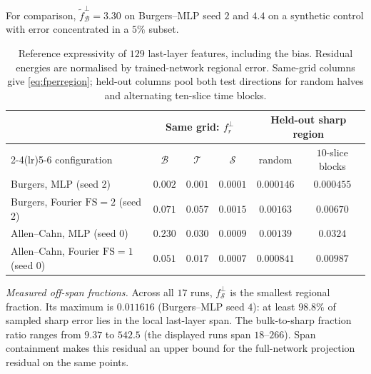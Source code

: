 For comparison, $\tilde f_{\mathcal B}^\perp=3.30$ on Burgers--MLP seed $2$ and $4.4$
on a synthetic control with error concentrated in a $5\%$ subset.

\begin{table}[t]
\centering

\small
\begin{tabular}{@{}lccccc@{}}
\toprule
& \multicolumn{3}{c}{Same grid: $f^{\perp}_r$} & \multicolumn{2}{c}{Held-out sharp region} \\
\cmidrule(lr){2-4}\cmidrule(lr){5-6}
configuration & $\mathcal{B}$ & $\mathcal{T}$ & $\mathcal{S}$ & random & $10$-slice blocks \\
\midrule
Burgers, MLP (seed 2)                        & $0.002$ & $0.001$ & $\mathbf{0.0001}$ & $0.000146$ & $0.000455$ \\
Burgers, Fourier $\mathrm{FS}=2$ (seed 2)    & $0.071$ & $0.057$ & $\mathbf{0.0015}$ & $0.00163$ & $0.00670$ \\
Allen--Cahn, MLP (seed 0)                    & $0.230$ & $0.030$ & $\mathbf{0.0009}$ & $0.00139$ & $0.0324$ \\
Allen--Cahn, Fourier $\mathrm{FS}=1$ (seed 0)& $0.051$ & $0.017$ & $\mathbf{0.0007}$ & $0.000841$ & $0.00987$ \\
\bottomrule
\end{tabular}
\caption{Reference expressivity of $129$ last-layer features, including the bias.
Residual energies are normalised by trained-network regional error. Same-grid columns
give \eqref{eq:fperregion}; held-out columns pool both test directions for random halves
and alternating ten-slice time blocks.}
\label{tab:offmanifold}
\end{table}

\emph{Measured off-span fractions.} Across all $17$ runs,
$f_{\mathcal S}^\perp$ is the smallest regional fraction. Its maximum
is $0.011616$ (Burgers--MLP seed $4$): at least $98.8\%$ of sampled sharp error lies
in the local last-layer span. The bulk-to-sharp fraction ratio ranges from $9.37$ to
$542.5$ (the displayed runs span $18$--$266$). Span containment makes this residual
an upper bound for the full-network projection residual on the same points.

